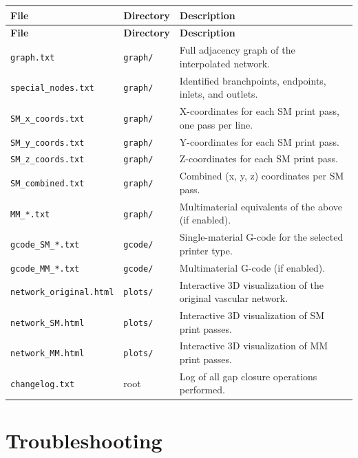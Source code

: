 \documentclass[11pt,letterpaper]{article}
\newcommand{\code}[1]{\texttt{#1}}
\begin{document}
\begin{xltabular}{\textwidth}{L{4cm} L{2cm} X}
\toprule
\textbf{File} & \textbf{Directory} & \textbf{Description} \\
\midrule
\endfirsthead
\toprule
\textbf{File} & \textbf{Directory} & \textbf{Description} \\
\midrule
\endhead
\code{graph.txt} & \code{graph/} & Full adjacency graph of the interpolated network. \\
\code{special\_nodes.txt} & \code{graph/} & Identified branchpoints, endpoints, inlets, and outlets. \\
\code{SM\_x\_coords.txt} & \code{graph/} & X-coordinates for each SM print pass, one pass per line. \\
\code{SM\_y\_coords.txt} & \code{graph/} & Y-coordinates for each SM print pass. \\
\code{SM\_z\_coords.txt} & \code{graph/} & Z-coordinates for each SM print pass. \\
\code{SM\_combined.txt} & \code{graph/} & Combined (x, y, z) coordinates per SM pass. \\
\code{MM\_*.txt} & \code{graph/} & Multimaterial equivalents of the above (if enabled). \\
\code{gcode\_SM\_*.txt} & \code{gcode/} & Single-material G-code for the selected printer type. \\
\code{gcode\_MM\_*.txt} & \code{gcode/} & Multimaterial G-code (if enabled). \\
\code{network\_original.html} & \code{plots/} & Interactive 3D visualization of the original vascular network. \\
\code{network\_SM.html} & \code{plots/} & Interactive 3D visualization of SM print passes. \\
\code{network\_MM.html} & \code{plots/} & Interactive 3D visualization of MM print passes. \\
\code{changelog.txt} & root & Log of all gap closure operations performed. \\
\bottomrule
\end{xltabular}

\section{Troubleshooting}
\label{sec:troubleshooting}
\end{document}
